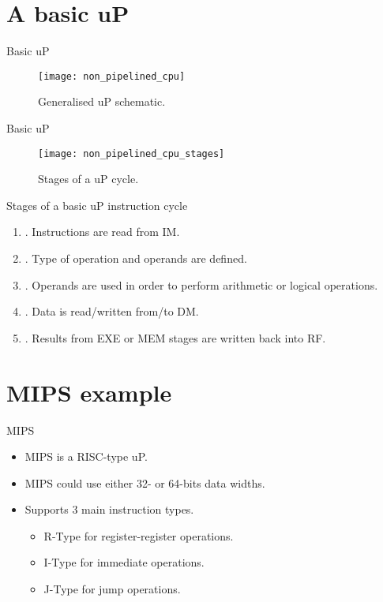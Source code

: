\section{A basic \acl{uP}}
% 
\begin{frame}{Basic \ac{uP}}
  \begin{figure}
  \centering
  \texttt{[image: non\_pipelined\_cpu]}
  \caption{Generalised \ac{uP} schematic.}
  \label{Figure:non_pipelined_cpu}
  \end{figure}
\end{frame}

% 
\begin{frame}{Basic \ac{uP}}
  \begin{figure}
  \centering
  \texttt{[image: non\_pipelined\_cpu\_stages]}
  \caption{Stages of a \ac{uP} cycle.}
  \label{Figure:non_pipelined_cpu_stages}
  \end{figure}
\end{frame}


% 
\begin{frame}{Stages of a basic \ac{uP} instruction cycle}
\begin{enumerate}
\item {}. Instructions are read from \ac{IM}.
\item {}. Type of operation and operands are defined.
\item {}. Operands are used in order to perform arithmetic or logical operations.
\item {}. Data is read/written from/to \ac{DM}.
\item {}. Results from \ac{EXE} or \ac{MEM} stages are written back into \ac{RF}.
\end{enumerate}
\end{frame}

% 

\section{MIPS example}
\begin{frame}{\acs{MIPS}}{}
  \begin{itemize}
  \item \ac{MIPS} is a \ac{RISC}-type \ac{uP}.
  \item \ac{MIPS} could use either 32- or 64-bits data widths.
  \item Supports 3 main instruction types.
    \begin{itemize}
    \item R-Type for register-register operations.
    \item I-Type for immediate operations.
    \item J-Type for jump operations.
    \end{itemize}
  \end{itemize}
\end{frame}

